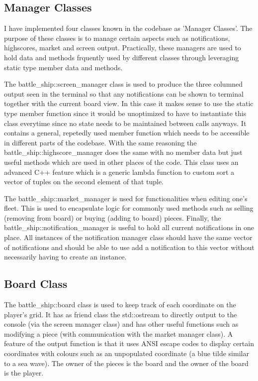 \documentclass[11pt]{article} %
\begin{document}
\subsection{Manager Classes}
I have implemented four classes known in the codebase as 'Manager Classes'.
The purpose of these classes is to manage certain aspects such as notifications, highscores, market and screen output.
Practically, these managers are used to hold data and methods frquently used by different classes through
leveraging static type member data and methods.
\\
\par The battle\_ship::screen\_manager class is used to produce the three columned output seen in the terminal
so that any notifications can be shown to terminal together with the current board view.
In this case it makes sense to use the static type member function since it would be unoptimized to
have to instantiate this class everytime since no state needs to be maintained between calls anyways.
It contains a general, repetedly used member function which needs to be accessible in different parts of the codebase.
With the same reasoning the battle\_ship::highscore\_manager does the same with no member data but just useful methods
which are used in other places of the code. This class uses an advanced C++ feature which is a generic lambda function
to custom sort a vector of tuples on the second element of that tuple.
\\
\par The battle\_ship::market\_manager is used for functionalities when editing one's fleet.
This is used to encapsulate logic for commonly used methods such as selling (removing from board) or buying (adding to board) pieces.
Finally, the battle\_ship::notification\_manager is useful to hold all current notifications in one place.
All instances of the notification manager class should have the same vector of notifications and should be able
to use add a notification to this vector without necessarily having to create an instance.
\subsection{Board Class}
The battle\_ship::board class is used to keep track of each coordinate on the player's grid.
It has as friend class the std::ostream to directly output to the console (via the screen manager class)
and has other useful functions such as modifying a piece (with communication with the market manager class).
A feature of the output function is that it uses ANSI escape codes to display certain coordinates with colours such as an unpopulated
coordinate (a blue tilde similar to a sea wave).
The owner of the pieces is the board and the owner of the board is the player.
\end{document}
